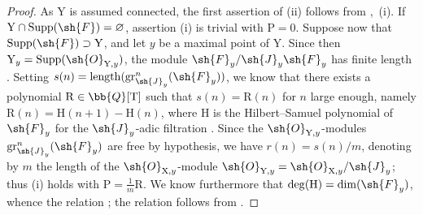 \begin{proof}
As $\mathrm{Y}$ is assumed connected, the first assertion of (ii) follows from ,~(i). If $\mathrm{Y}\cap\operatorname{Supp}(\sh{F})=\varnothing$, assertion (i) is trivial with $\mathrm{P}=0$. Suppose now that $\operatorname{Supp}(\sh{F})\supset\mathrm{Y}$, and let $y$ be a maximal point of $\mathrm{Y}$. Since then $\mathrm{Y}_y=\operatorname{Supp}(\sh{O}_{\mathrm{Y},y})$, the module $\sh{F}_y/\sh{J}_y\sh{F}_y$ has finite length . Setting $s(n)=\operatorname{length}(\operatorname{gr}^n_{\sh{J}_y}(\sh{F}_y))$, we know that there exists a polynomial $\mathrm{R}\in\bb{Q}[\mathrm{T}]$ such that $s(n)=\mathrm{R}(n)$ for $n$ large enough, namely $\mathrm{R}(n)=\mathrm{H}(n+1)-\mathrm{H}(n)$, where $\mathrm{H}$ is the Hilbert--Samuel polynomial of $\sh{F}_y$ for the $\sh{J}_y$-adic filtration . Since the $\sh{O}_{\mathrm{Y},y}$-modules $\operatorname{gr}^n_{\sh{J}_y}(\sh{F}_y)$ are free by hypothesis, we have $r(n)=s(n)/m$, denoting by $m$ the length of the $\sh{O}_{\mathrm{X},y}$-module $\sh{O}_{\mathrm{Y},y}=\sh{O}_{\mathrm{X},y}/\sh{J}_y$; thus (i) holds with $\mathrm{P}=\frac{1}{m}\mathrm{R}$. We know furthermore  that $\deg(\mathrm{H})=\dim(\sh{F}_y)$, whence the relation ; the relation  follows from .


\end{proof}
